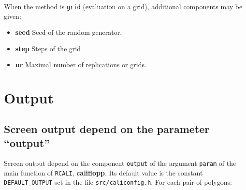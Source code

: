 \documentclass[a4paper,twoside,openright]{report}
\begin{document}
When the method is \texttt{grid} (evaluation on a grid), additional components may be given:
\begin{itemize}
\item
\textbf{seed}
Seed of the random generator. 
\item
\textbf{step}
Steps of the grid
\item
\textbf{nr}
Maximal number of replications or grids.
\end{itemize}



\chapter{Output}


\section{Screen output depend on the parameter ``output''}
\label{screen}
Screen output 
depend on the component \texttt{output}  of the argument \texttt{param}
of the main function of \verb+RCALI+, \textbf{califlopp}.
Its default value is the constant
\texttt{DEFAULT\_OUTPUT} set in the
file \texttt{src/caliconfig.h}.
For each pair of polygons:
\end{document}
